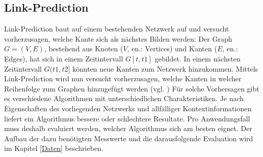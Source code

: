\subsection{Link-Prediction}
Link-Prediction baut auf einem bestehenden Netzwerk auf und versucht vorherzusagen, welche Kante sich als nächstes Bilden werden:
Der Graph $G = (V, E)$, bestehend aus Knoten ($V$, en.: Vertices) und Kanten ($E$, en.: Edges), hat sich in einem Zeitintervall $G[t, t1]$ gebildet.
In einem nächsten Zeitintervall $G(t1, t2]$ könnten neue Kanten zum Netzwerk hinzukommen.
Mittels Link-Prediction wird nun versucht vorherzusagen, welche Kanten in welcher Reihenfolge zum Graphen hinzugefügt werden (vgl. \cite{gao_link_2015})
Für solche Vorhersagen gibt es verschiedene Algorithmen mit unterschiedlichen Charakteristiken.
Je nach Eigenschaften des vorliegenden Netzwerks und allfälliger Kontextinformationen liefert ein Algorithmus bessere oder schlechtere Resultate.
Pro Anwendungsfall muss deshalb evaluiert werden, welcher Algorithmus sich am besten eignet.
Der Aufbau der dazu benötigten Messwerte und die darausfolgende Evaluation wird im Kapitel \ref{Daten} beschrieben.
